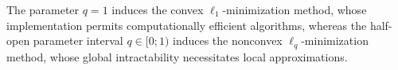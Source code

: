The parameter $q = 1$ induces
the convex $\ell_{1}$-minimization method, whose
implementation permits
computationally efficient algorithms, whereas
the half-open parameter interval
$q \in [ 0; 1 )$ induces
the nonconvex $\ell_{q}$-minimization method, whose
global intractability necessitates
local approximations.

